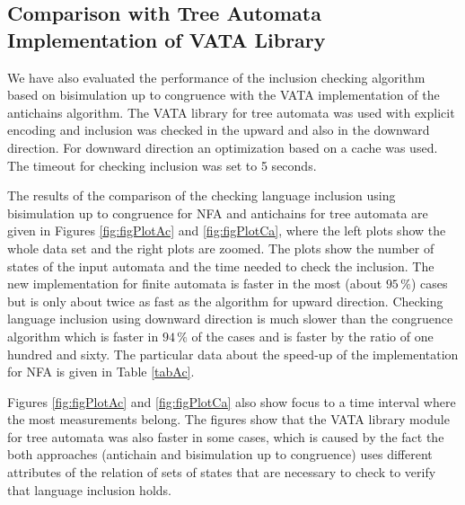 \subsection{Comparison with Tree Automata Implementation of VATA Library}
We have also evaluated the performance of the inclusion checking algorithm based on bisimulation up to congruence with the VATA implementation of the antichains
algorithm.
The VATA library for tree automata was used with explicit encoding and inclusion was checked in the upward and also in the downward direction. 
For downward direction an optimization based on a cache was used. The timeout for checking inclusion was set to 5 seconds.

The results of the comparison of the checking language inclusion using bisimulation up to congruence for NFA and antichains for tree automata 
are given in Figures \ref{fig:figPlotAc} and \ref{fig:figPlotCa}, where the left plots show the whole data set and the right plots are zoomed. 
The plots show the number of states of the input
automata and the time needed to check the inclusion. The new implementation for finite automata is faster in the
most (about $95\,\%$) cases but is only about twice as fast as the algorithm for upward direction. 
Checking language inclusion using downward direction is much slower than 
the congruence algorithm which is faster in $94\,\%$ of the cases  and is faster by the ratio of one hundred and sixty. The particular data about the speed-up 
of the implementation for NFA is given in Table \ref{tabAc}.

Figures \ref{fig:figPlotAc} and \ref{fig:figPlotCa} also show
focus to a time interval where the most measurements belong. The figures show that the VATA library module for tree automata was
also faster in some cases, which is caused by the fact the both approaches (antichain and bisimulation up to congruence) uses different attributes of the relation
of sets of states that are necessary to check to verify that language inclusion holds.

